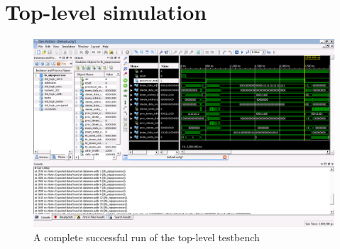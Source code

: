 \chapter{Top-level simulation}

\begin{figure}[ht!]
  \begin{center}
    \includegraphics[width=\textwidth]{assets/toplevel-sim.png}
  \end{center}
  \caption{A complete successful run of the top-level testbench}
  \label{fig:toplevel_sim}
\end{figure}
